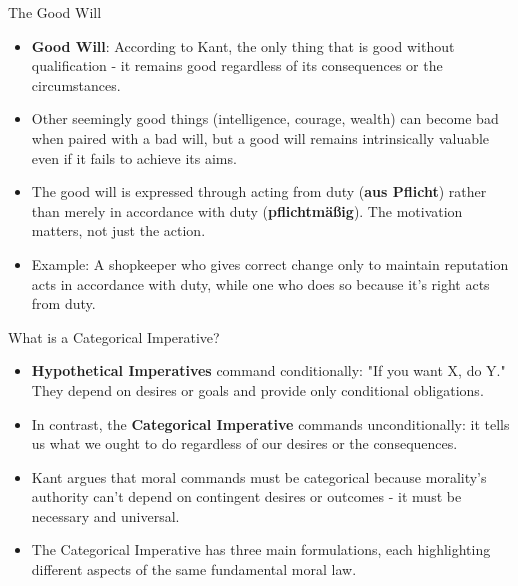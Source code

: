 \documentclass{beamer}
\begin{document}
\begin{frame}{The Good Will}
\begin{itemize}
    \item \textbf{Good Will}: According to Kant, the only thing that is good without qualification - it remains good regardless of its consequences or the circumstances.
    
    \item Other seemingly good things (intelligence, courage, wealth) can become bad when paired with a bad will, but a good will remains intrinsically valuable even if it fails to achieve its aims.
    
    \item The good will is expressed through acting from duty (\textbf{aus Pflicht}) rather than merely in accordance with duty (\textbf{pflichtmäßig}). The motivation matters, not just the action.
    
    \item Example: A shopkeeper who gives correct change only to maintain reputation acts in accordance with duty, while one who does so because it's right acts from duty.
\end{itemize}
\end{frame}


\begin{frame}{What is a Categorical Imperative?}
\begin{itemize}
    \item \textbf{Hypothetical Imperatives} command conditionally: "If you want X, do Y." They depend on desires or goals and provide only conditional obligations.
    
    \item In contrast, the \textbf{Categorical Imperative} commands unconditionally: it tells us what we ought to do regardless of our desires or the consequences.
    
    \item Kant argues that moral commands must be categorical because morality's authority can't depend on contingent desires or outcomes - it must be necessary and universal.
    
    \item The Categorical Imperative has three main formulations, each highlighting different aspects of the same fundamental moral law.
\end{itemize}
\end{frame}
\end{document}

